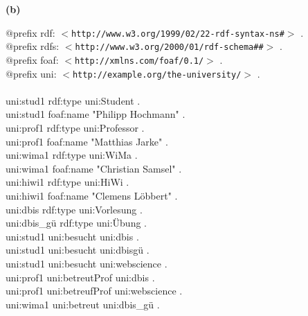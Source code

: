 \documentclass[11pt, a4paper]{article}
\newcommand{\aufgabenteil}[1] {\textbf{(#1)}}
\begin{document}
\aufgabenteil{b}
\begin{adjustwidth}{20pt}{20pt}
\begin{tt}
$@$prefix rdf: $<$\nolinkurl{http://www.w3.org/1999/02/22-rdf-syntax-ns#}$>$ .\\
$@$prefix rdfs: $<$\nolinkurl{http://www.w3.org/2000/01/rdf-schema##}$>$ .\\
$@$prefix foaf: $<$\nolinkurl{http://xmlns.com/foaf/0.1/}$>$ .\\
$@$prefix uni: $<$\nolinkurl{http://example.org/the-university/}$>$ .\\
\ \\
uni:stud1 rdf:type uni:Student .\\
uni:stud1 foaf:name "Philipp Hochmann" .\\
uni:prof1 rdf:type uni:Professor .\\
uni:prof1 foaf:name "Matthias Jarke" .\\
uni:wima1 rdf:type uni:WiMa .\\
uni:wima1 foaf:name "Christian Samsel" .\\
uni:hiwi1 rdf:type uni:HiWi .\\
uni:hiwi1 foaf:name "Clemens Löbbert" .\\

uni:dbis rdf:type uni:Vorlesung .\\
uni:dbis\_gü rdf:type uni:Übung .\\

uni:stud1 uni:besucht uni:dbis .\\
uni:stud1 uni:besucht uni:dbisgü .\\
uni:stud1 uni:besucht uni:webscience .\\

uni:prof1 uni:betreutProf uni:dbis .\\
uni:prof1 uni:betreufProf uni:webscience .\\
uni:wima1 uni:betreut uni:dbis\_gü .\\


\end{tt}
\end{adjustwidth}

\end{document}

